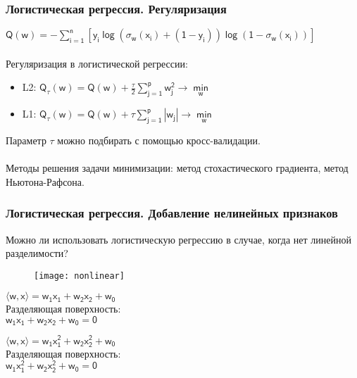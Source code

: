 \documentclass[unicode, notheorems]{beamer}
\begin{document}
\begin{frame}
\frametitle{Логистическая регрессия. Регуляризация}
$\mathsf{Q(w)=-\sum\limits_{i=1}^n [y_i\log (\sigma_w(x_i)+(1-y_i))\log (1-\sigma_w(x_i))]}$ \\
~~\\
Регуляризация в логистической регрессии:
\begin{itemize}
	\item {\alert{L2}: 
	$\mathsf{Q_\tau(w)=Q(w)+\frac{\tau}{2}\sum\limits_{j=1}^p w_j^2 \to \min\limits_w}$
		}
	\item {\alert{L1}: 
		$\mathsf{Q_\tau(w)=Q(w)+\tau\sum\limits_{j=1}^p |w_j| \to \min\limits_w}$
	}
\end{itemize}
Параметр $\mathsf{\tau}$ можно подбирать с помощью кросс-валидации. \\
~ \\
Методы решения задачи минимизации: метод стохастического градиента, метод Ньютона-Рафсона.
\end{frame}

	
	\begin{frame}
	\frametitle{Логистическая регрессия. Добавление нелинейных признаков}
	Можно ли использовать логистическую регрессию в случае, когда нет линейной разделимости?
	\begin{figure}[h]
		\begin{center}
			\begin{minipage}[h]{0.75\linewidth}
				\texttt{[image: nonlinear]}
				\label{series_IRLS} %
			\end{minipage}
			
		\end{center}
	\end{figure}
\begin{minipage}{0.5\textwidth}
	$\mathsf{\langle w,x\rangle =w_1x_1+w_2x_2+w_0}$ \\
	Разделяющая поверхность: \\
	$\mathsf{w_1x_1+w_2x_2+w_0 =0}$
\end{minipage}
\hfill
\begin{minipage}{0.45\textwidth}
	$\mathsf{\langle w,x\rangle =w_1x_1^2+w_2x_2^2+w_0}$ \\
Разделяющая поверхность: \\
$\mathsf{w_1x_1^2+w_2x_2^2+w_0 =0}$
\end{minipage}
\end{frame}
\end{document}
